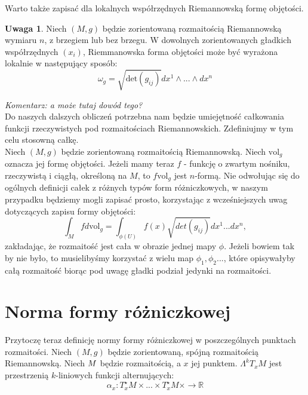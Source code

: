 \documentclass[licencjacka]{pracamgr}
\theoremstyle{definition}
\theoremstyle{definition}
\newtheorem{remark}{Uwaga}[section]
\theoremstyle{plain}
\theoremstyle{plain}
\theoremstyle{plain}
\def\M{\ensuremath M}
\begin{document}
Warto także zapisać dla lokalnych współrzędnych Riemannowską formę objętości. 
\begin{remark} %
Niech $(M, g)$ będzie zorientowaną rozmaitością Riemannowską wymiaru $n$, z
brzegiem lub bez brzegu. W dowolnych zorientowanych gładkich współrzędnych
$(x_i)$, Riemmanowska forma objętości może być wyrażona lokalnie w następujący
sposób:
\[
    \omega_g = \sqrt{\text{det}(g_{ij})} dx^1 \wedge ... \wedge dx^n
\]
\end{remark}
\emph{Komentarz: a może tutaj dowód tego? }\\

Do naszych dalszych obliczeń potrzebna nam będzie umiejętność całkowania
funkcji rzeczywistych pod rozmaitościach Riemannowskich. Zdefiniujmy w tym celu
stosowną całkę. \\

Niech $(M, g)$ będzie zorientowaną rozmaitością Riemannowską. Niech
$\text{vol}_g$ oznacza jej formę objętości. Jeżeli mamy teraz $f$ -
funkcję o zwartym nośniku, rzeczywistą i ciągłą, określoną na $M$, to
$f \text{vol}_g$ jest $n$-formą.
Nie odwołując się do ogólnych definicji całek z różnych typów form
różniczkowych, w naszym przypadku będziemy mogli zapisać prosto, korzystając z
wcześniejszych uwag dotyczących zapisu formy objętości:
\[ %
  \int_M f d \text{vol}_g = \int_{\phi (U)} f(x) \sqrt{det(g_{ij})} dx^1 ... dx^n,
\]
zakładając, że rozmaitość jest cała w obrazie jednej mapy
$\phi$. Jeżeli bowiem tak by nie było, to musielibyśmy korzystać z
wielu map $\phi_1, \phi_2 ... $, które opisywałyby całą rozmaitość
biorąc pod uwagę gładki podział jedynki na rozmaitości. \\



\section{Norma formy różniczkowej}

Przytoczę teraz definicję normy formy różniczkowej w poszczególnych punktach
rozmaitości. Niech $(M, g)$ będzie zorientowaną, spójną %
rozmaitością Riemannowską. Niech $\M$ będzie rozmaitością, a $x$ jej punktem.
$\Lambda^k T_x M$ jest przestrzenią $k$-liniowych funkcji alternujących:
\[
    \alpha_x:T_x^\star M \times ... \times T_x^\star M \times \rightarrow \mathbb{R}
\] \\
\end{document}
